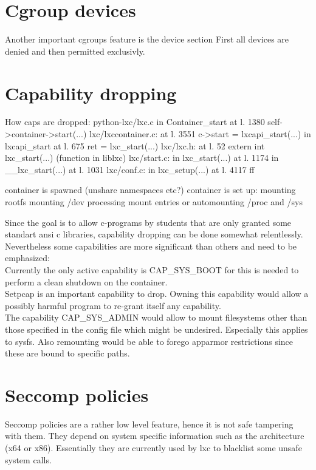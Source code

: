 \section{Cgroup devices}

Another important cgroups feature is the device section
First all devices are denied and then permitted exclusivly.

\section{Capability dropping}

How caps are dropped:
python-lxc/lxc.c in Container\_start at l. 1380 self->container->start(...)
lxc/lxccontainer.c: at l. 3551 c->start = lxcapi\_start(...)
		    in lxcapi\_start at l. 675 ret = lxc\_start(...)
lxc/lxc.h: at l. 52 extern int lxc\_start(...) (function in liblxc)
lxc/start.c: in lxc\_start(...) at l. 1174
	     in \_\_lxc\_start(...) at l. 1031
lxc/conf.c: in lxc\_setup(...) at l. 4117 ff

container is spawned
  (unshare namespaces etc?)
container is set up:
  mounting rootfs
  mounting /dev
  processing mount entries or automounting /proc and /sys

Since the goal is to allow c-programs by students that are only granted some standart ansi c libraries, capability dropping can be
done somewhat relentlessly. Nevertheless some capabilities are more significant than others and need to be emphasized:\\
Currently the only active capability is CAP\_SYS\_BOOT for this is needed to perform a clean shutdown on the container.\\
Setpcap is an important capability to drop. Owning this capability would allow a possibly harmful program to re-grant itself any
capability\cite{kernelcaps}.\\
The capability CAP\_SYS\_ADMIN would allow to mount filesystems other than those specified in the config file which might be undesired.
Especially this applies to sysfs. Also remounting would be able to forego apparmor restrictions since these are bound to specific paths.\\


\section{Seccomp policies}

Seccomp policies are a rather low level feature, hence it is not safe tampering with them. They depend on system specific information such
as the architecture (x64 or x86). Essentially they are currently used by lxc to blacklist some unsafe system calls.